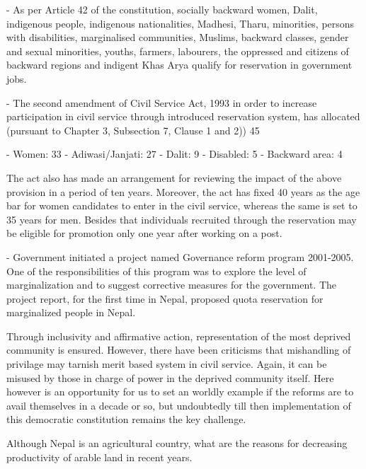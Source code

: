 \documentclass[
  openany]{book}
\newcommand{\question}{\item}
\begin{document}
\begin{questions}
- As per Article 42 of the constitution, socially backward women, Dalit, indigenous people, indigenous nationalities, Madhesi, Tharu, minorities, persons with disabilities, marginalised communities, Muslims, backward classes, gender and sexual minorities, youths, farmers, labourers, the oppressed and citizens of backward regions and indigent Khas Arya qualify for reservation in government jobs.

- The second amendment of Civil Service Act, 1993 in order to increase participation in civil service through introduced reservation system, has allocated (pursuant to Chapter 3, Subsection 7, Clause 1 and 2)) 45%

  - Women: 33%
  - Adiwasi/Janjati: 27%
  - Dalit: 9%
  - Disabled: 5%
  - Backward area: 4%
  
The act also has made an arrangement for reviewing the impact of the above provision in a period of ten years. Moreover, the act has fixed 40 years as the age bar for women candidates to enter in the civil service, whereas the same is set to 35 years for men. Besides that individuals recruited through the reservation may be eligible for promotion only one year after working on a post.

- Government initiated a project named Governance reform program 2001-2005. One of the responsibilities of this program was to explore the level of marginalization and to suggest corrective measures for the government. The project report, for the first time in Nepal, proposed quota reservation for marginalized people in Nepal.

Through inclusivity and affirmative action, representation of the most deprived community is ensured. However, there have been criticisms that mishandling of privilage may tarnish merit based system in civil service. Again, it can be misused by those in charge of power in the deprived community itself. Here however is an opportunity for us to set an worldly example if the reforms are to avail themselves in a decade or so, but undoubtedly till then implementation of this democratic constitution remains the key challenge.

\question Although Nepal is an agricultural country, what are the reasons for decreasing productivity of arable land in recent years.


\end{questions}
\end{document}
